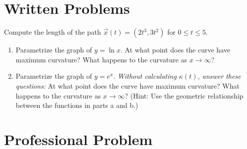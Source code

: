 \documentclass{ximera}
\begin{document}
\section*{Written Problems}

\begin{problem}
Compute the length of the path $\vec{x}(t) = (2t^3,3t^2)$ for $0\leq t\leq 5$.
\end{problem}

\begin{problem}
\begin{enumerate}
\item Parametrize the graph of $y = \ln x$.  At what point does the curve have maximum curvature?  What happens to the curvature as $x \to \infty$?
\item Parametrize the graph of $y = e^{x}$. \emph{Without calculating $\kappa(t)$, answer these questions:} At what point does the curve have maximum curvature?  What happens to the curvature as $x \to \infty$? (Hint: Use the geometric relationship between the functions in parts a and b.) %
\end{enumerate}
\end{problem}

\section*{Professional Problem}
\end{document}
